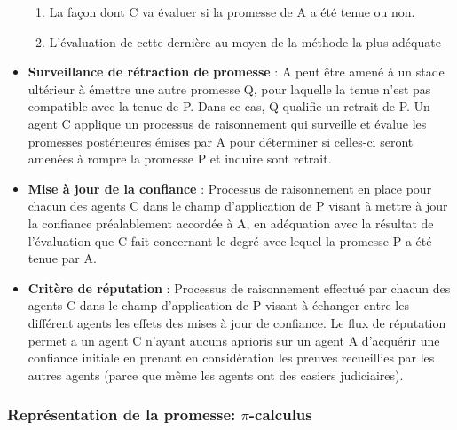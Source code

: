 \begin{itemize}
  	\begin{enumerate}
	  \item La façon dont C va évaluer si la promesse de A a été tenue ou
		  non.
      \item L'évaluation de cette dernière au moyen de la méthode la plus
          adéquate
  	\end{enumerate}
  \item \textbf{Surveillance de rétraction de promesse} :
	A peut être amené à un stade ultérieur à émettre une autre promesse Q,
	pour laquelle la tenue n'est pas compatible avec la tenue de P. Dans ce
	cas, Q qualifie un retrait de P. Un agent C applique un processus de
	raisonnement qui surveille et évalue les promesses postérieures émises
	par A pour déterminer si celles-ci seront amenées à rompre la promesse P
	et induire sont retrait.
  \item \textbf{Mise à jour de la confiance} :
	Processus de raisonnement en place pour chacun des agents C dans le champ
	d'application de P visant à mettre à jour la confiance préalablement
	accordée à A, en adéquation avec la résultat de l'évaluation que C fait
	concernant le degré avec lequel la promesse P a été tenue par A.
  \item \textbf{Critère de réputation} :
	Processus de raisonnement effectué par chacun des agents C dans le champ
	d'application de P visant à échanger entre les différent agents les
	effets des mises à jour de confiance. Le flux de réputation permet a un
	agent C n'ayant aucuns aprioris sur un agent A d'acquérir une confiance
	initiale en prenant en considération les preuves recueillies par les
    autres agents (parce que même les agents ont des casiers judiciaires).
\end{itemize}

\subsubsection{Représentation de la promesse: $\pi$-calculus}


